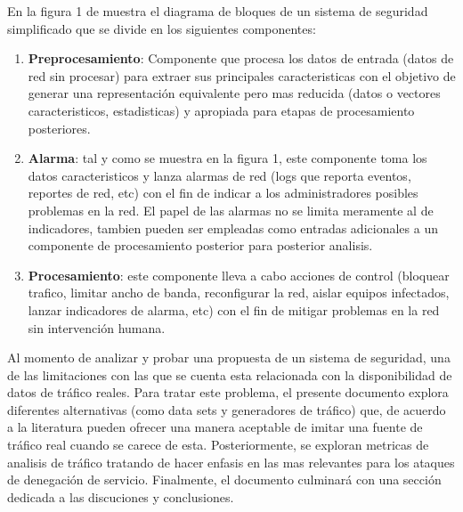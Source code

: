 \documentclass[12pt]{article}
\begin{document}
En la figura 1 de muestra el diagrama de bloques  de un sistema de seguridad
simplificado que se divide en los siguientes componentes:
\begin{enumerate}
\item \textbf{Preprocesamiento}: Componente que procesa los datos de
  entrada (datos de red sin procesar) para extraer sus principales
  caracteristicas con el objetivo de generar una representación
  equivalente pero mas reducida (datos o vectores caracteristicos,
  estadisticas) y apropiada para etapas de procesamiento posteriores.
\item \textbf{Alarma}: tal y como se muestra en la figura 1, este
  componente toma los datos caracteristicos y lanza alarmas de red
  (logs que reporta eventos, reportes de red, etc) con el fin de
  indicar a los administradores posibles problemas en la red. El papel
  de las alarmas no se limita meramente al de indicadores, tambien
  pueden ser empleadas como entradas adicionales a un componente de
  procesamiento posterior para posterior analisis.
\item \textbf{Procesamiento}:  este componente lleva a cabo acciones de control
  (bloquear trafico, limitar ancho de banda, reconfigurar la red,
  aislar equipos infectados, lanzar indicadores de alarma, etc) con el
  fin de mitigar problemas en la red sin intervención humana.
\end{enumerate}

Al momento de analizar y probar una propuesta de un sistema de
seguridad, una de las limitaciones con las que se cuenta esta
relacionada con la disponibilidad de datos de tráfico reales. Para
tratar este problema, el presente documento explora diferentes
alternativas (como data sets y generadores de tráfico) que, de acuerdo
a la literatura pueden ofrecer una manera aceptable de imitar una
fuente de tráfico real cuando se carece de esta. Posteriormente, se
exploran metricas de analisis de tráfico tratando de hacer enfasis en
las mas relevantes para los ataques de denegación de
servicio. Finalmente, el documento culminará con una sección dedicada
a las discuciones y conclusiones.
\end{document}
